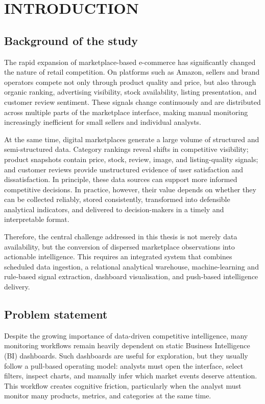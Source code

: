 \chapter{INTRODUCTION}
\label{chap:introduction}

\section{Background of the study}

The rapid expansion of marketplace-based e-commerce has significantly
changed the nature of retail competition. On platforms such as Amazon,
sellers and brand operators compete not only through product quality and
price, but also through organic ranking, advertising visibility, stock
availability, listing presentation, and customer review sentiment. These
signals change continuously and are distributed across multiple parts of
the marketplace interface, making manual monitoring increasingly
inefficient for small sellers and individual analysts.

At the same time, digital marketplaces generate a large volume of
structured and semi-structured data. Category rankings reveal shifts in
competitive visibility; product snapshots contain price, stock, review,
image, and listing-quality signals; and customer reviews provide
unstructured evidence of user satisfaction and dissatisfaction. In
principle, these data sources can support more informed competitive
decisions. In practice, however, their value depends on whether they can
be collected reliably, stored consistently, transformed into defensible
analytical indicators, and delivered to decision-makers in a timely and
interpretable format.

Therefore, the central challenge addressed in this thesis is not merely
data availability, but the conversion of dispersed marketplace
observations into actionable intelligence. This requires an integrated
system that combines scheduled data ingestion, a relational analytical
warehouse, machine-learning and rule-based signal extraction, dashboard
visualisation, and push-based intelligence delivery.

\section{Problem statement}

Despite the growing importance of data-driven competitive intelligence,
many monitoring workflows remain heavily dependent on static Business
Intelligence (BI) dashboards. Such dashboards are useful for exploration,
but they usually follow a pull-based operating model: analysts must open
the interface, select filters, inspect charts, and manually infer which
market events deserve attention. This workflow creates cognitive
friction, particularly when the analyst must monitor many products,
metrics, and categories at the same time.

